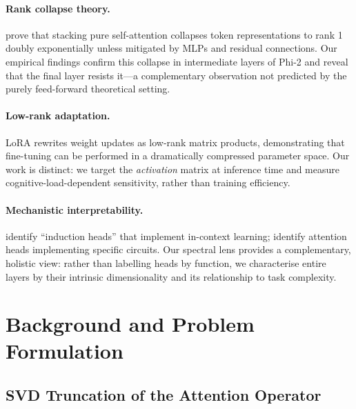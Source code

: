 \documentclass{article}
\begin{document}
\paragraph{Rank collapse theory.}
\citet{dong2021attention} prove that stacking pure self-attention collapses token
representations to rank 1 doubly exponentially unless mitigated by MLPs and
residual connections.  Our empirical findings confirm this collapse in intermediate
layers of Phi-2 and reveal that the final layer resists it---a complementary
observation not predicted by the purely feed-forward theoretical setting.

\paragraph{Low-rank adaptation.}
LoRA \citep{hu2021lora} rewrites weight updates as low-rank matrix products,
demonstrating that fine-tuning can be performed in a dramatically compressed
parameter space.  Our work is distinct: we target the \emph{activation} matrix
at inference time and measure cognitive-load-dependent sensitivity, rather than
training efficiency.

\paragraph{Mechanistic interpretability.}
\citet{olsson2022incontext} identify ``induction heads'' that implement in-context
learning; \citet{wang2022interpretability} identify attention heads implementing
specific circuits.  Our spectral lens provides a complementary, holistic view:
rather than labelling heads by function, we characterise entire layers by their
intrinsic dimensionality and its relationship to task complexity.

\section{Background and Problem Formulation}
\label{sec:background}

\subsection{SVD Truncation of the Attention Operator}
\end{document}
